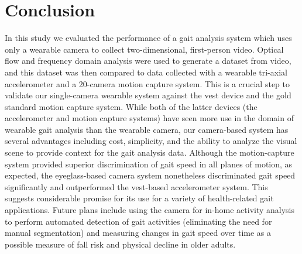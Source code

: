 \documentclass[12pt]{report}
\begin{document}
\section{Conclusion}
In this study we evaluated the performance of a gait analysis system which uses only a wearable camera to collect two-dimensional, first-person video. Optical flow and frequency domain analysis were used to generate a dataset from video, and this dataset was then compared to data collected with a wearable tri-axial accelerometer and a 20-camera motion capture system. This is a crucial step to validate our single-camera wearable system against the vest device and the gold standard motion capture system. While both of the latter devices (the accelerometer and motion capture systems) have seen more use in the domain of wearable gait analysis than the wearable camera, our camera-based system has several advantages including cost, simplicity, and the ability to analyze the visual scene to provide context for the gait analysis data. Although the motion-capture system provided superior discrimination of gait speed in all planes of motion, as expected, the eyeglass-based camera system nonetheless discriminated gait speed significantly and outperformed the vest-based accelerometer system. This suggests considerable promise for its use for a variety of health-related gait applications. Future plans include using the camera for in-home activity analysis to perform automated detection of gait activities (eliminating the need for manual segmentation) and measuring changes in gait speed over time as a possible measure of fall risk and physical decline in older adults.



\end{document}
